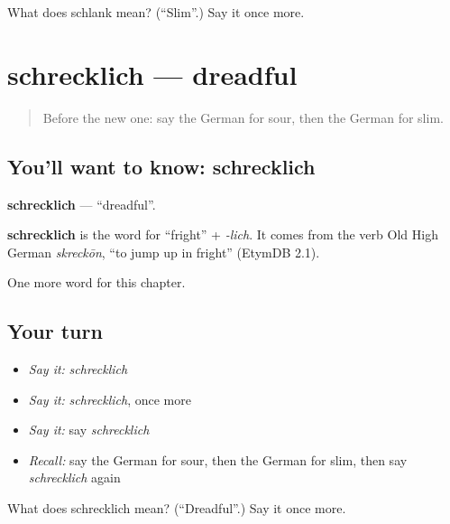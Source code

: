 \begin{tcolorbox}[breakable,colback=teal!4,colframe=teal!35!black,title={Before you move on}]
What does schlank mean? (\textquotedblleft{}Slim\textquotedblright{}.) Say it once more.
\end{tcolorbox}
\section[schrecklich]{schrecklich — dreadful}

\label{lesson:GE-C221-schrecklich}



\begin{quote}
Before the new one: say the German for sour, then the German for slim.
\end{quote}

\subsection*{You'll want to know: schrecklich}
\textbf{schrecklich} — \textquotedblleft{}dreadful\textquotedblright{}.

\begin{cousinweb}
\textbf{schrecklich} is the word for \textquotedblleft{}fright\textquotedblright{} + \emph{-lich}. It comes from the verb Old High German \emph{skreckōn}, \textquotedblleft{}to jump up in fright\textquotedblright{} (EtymDB 2.1).
\end{cousinweb}

\begin{grammarlens}[title={What you've built}]
One more word for this chapter.
\end{grammarlens}

\subsection*{Your turn}
\begin{itemize}
\raggedright
  \item \emph{Say it:} \emph{schrecklich}
  \item \emph{Say it:} \emph{schrecklich}, once more
  \item \emph{Say it:} say \emph{schrecklich}
  \item \emph{Recall:} say the German for sour, then the German for slim, then say \emph{schrecklich} again
\end{itemize}

\begin{tcolorbox}[breakable,colback=teal!4,colframe=teal!35!black,title={Before you move on}]
What does schrecklich mean? (\textquotedblleft{}Dreadful\textquotedblright{}.) Say it once more.
\end{tcolorbox}
